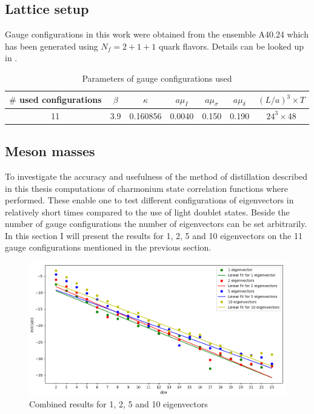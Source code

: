 

\subsection{Lattice setup}
    Gauge configurations in this work were obtained from the ensemble A40.24 which has been generated using $N_f = 2 + 1 + 1$ quark flavors. Details can be looked up in \cite{guage_configurations}. 
    
    \begin{table}[h]
        \centering
        \begin{tabular}{lllllll}
        \hline
        \multicolumn{1}{|c|}{$\#$ used configurations} & \multicolumn{1}{c|}{$\beta$} & \multicolumn{1}{c|}{$\kappa$} & \multicolumn{1}{c|}{$a\mu_I$} & \multicolumn{1}{c|}{$a\mu_\sigma$} & \multicolumn{1}{c|}{$a\mu_\delta$} & \multicolumn{1}{c|}{$(L/a)^3 \times T$} \\ \hline
        \multicolumn{1}{|c|}{11} & \multicolumn{1}{c|}{3.9} & \multicolumn{1}{c|}{0.160856} & \multicolumn{1}{c|}{0.0040} & \multicolumn{1}{c|}{0.150} & \multicolumn{1}{c|}{0.190} & \multicolumn{1}{c|}{$24^3 \times 48$} \\ \hline
        \end{tabular}
        \caption{Parameters of gauge configurations used}
        \label{table_gauge_params}
    \end{table}

    
\subsection{Meson masses}
    To investigate the accuracy and usefulness of the method of distillation described in this thesis computations of charmonium state correlation functions where performed. These enable one to test different configurations of eigenvectors in relatively short times compared to the use of light doublet states. Beside the number of gauge configurations the number of eigenvectors can be set arbitrarily. In this section I will present the results for 1, 2, 5 and 10 eigenvectors on the 11 gauge configurations mentioned in the previous section.\\
    
    \begin{figure}[H]
        \centering
        \includegraphics[width=1\textwidth]{images/1_2_5_10_evs_log.png}
        \caption{Combined results for 1, 2, 5 and 10 eigenvectors}
        \label{1_2_5_10_evs_log}
    \end{figure}
    
